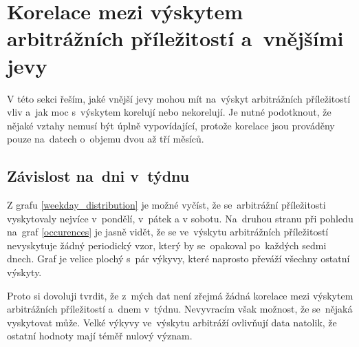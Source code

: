 \documentclass[thesis=B,czech]{FITthesis}[2019/03/21]
\begin{document}
\section{Korelace mezi výskytem arbitrážních příležitostí a~vnějšími jevy}
V této sekci řeším, jaké vnější jevy mohou mít na~výskyt arbitrážních příležitostí vliv a~jak moc s~výskytem korelují nebo nekorelují. Je nutné podotknout, že nějaké vztahy nemusí být úplně vypovídající, protože korelace jsou prováděny pouze na~datech o~objemu dvou až tří měsíců.

\subsection{Závislost na~dni v~týdnu}
Z grafu \ref{weekday_distribution} je možné vyčíst, že se~arbitrážní příležitosti vyskytovaly nejvíce v~pondělí, v~pátek a v sobotu. Na~druhou stranu při pohledu na~graf \ref{occurences} je jasně vidět, že se ve~výskytu arbitrážních příležitostí nevyskytuje žádný periodický vzor, který by se~opakoval po~každých sedmi dnech. Graf je velice plochý s~pár výkyvy, které naprosto převáží všechny ostatní výskyty.

Proto si dovoluji tvrdit, že z~mých dat není zřejmá žádná korelace mezi výskytem arbitrážních příležitostí a~dnem v~týdnu. Nevyvracím však možnost, že se~nějaká vyskytovat může. Velké výkyvy ve~výskytu arbitráží ovlivňují data natolik, že ostatní hodnoty mají téměř nulový význam.
\end{document}
